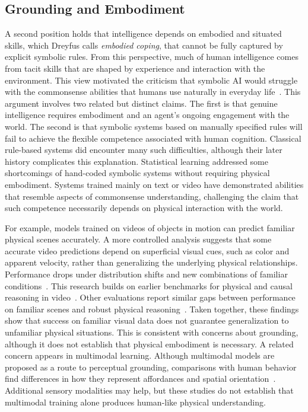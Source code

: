 \documentclass[acmsmall,screen,review,anonymous]{acmart}
\begin{document}
\subsection{Grounding and Embodiment}
\label{subsec:embodiment}
A second position holds that intelligence depends on embodied and situated skills, which Dreyfus calls \emph{embodied coping}, that cannot be fully captured by explicit symbolic rules.
%
From this perspective, much of human intelligence comes from tacit skills that are shaped by experience and interaction with the environment.
%
This view motivated the criticism that symbolic AI would struggle with the commonsense abilities that humans use naturally in everyday life~\citep{dreyfus1972}.
%
This argument involves two related but distinct claims.
%
The first is that genuine intelligence requires embodiment and an agent's ongoing engagement with the world. 
%
The second is that symbolic systems based on manually specified rules will fail to achieve the flexible competence associated with human cognition. 
%
Classical rule-based systems did encounter many such difficulties, although their later history complicates this explanation. 
%
Statistical learning addressed some shortcomings of hand-coded symbolic systems without requiring physical embodiment.
%
Systems trained mainly on text or video have demonstrated abilities that resemble aspects of commonsense understanding, challenging the claim that such competence necessarily depends on physical interaction with the world.

For example, models trained on videos of objects in motion can predict familiar physical scenes accurately.
%
A more controlled analysis suggests that some accurate video predictions depend on superficial visual cues, such as color and apparent velocity, rather than generalizing the underlying physical relationships.
%
Performance drops under distribution shifts and new combinations of familiar conditions~\citep{kang2025how}.
%
This research builds on earlier benchmarks for physical and causal reasoning in video~\citep{CLEVRER2020ICLR,mao2025clevrerhumansdescribingphysicalcausal}.
%
Other evaluations report similar gaps between performance on familiar scenes and robust physical reasoning~\citep{chow2025physbenchbenchmarkingenhancingvisionlanguage,tung2023physion,bansal2026videophy,motamed2026physics}.
%
Taken together, these findings show that success on familiar visual data does not guarantee generalization to unfamiliar physical situations.
%
This is consistent with concerns about grounding, although it does not establish that physical embodiment is necessary.
%
A related concern appears in multimodal learning.
%
Although multimodal models are proposed as a route to perceptual grounding, comparisons with human behavior find differences in how they represent affordances and spatial orientation~\citep{jones-etal-2024-multimodal}.
%
Additional sensory modalities may help, but these studies do not establish that multimodal training alone produces human-like physical understanding.
\end{document}
